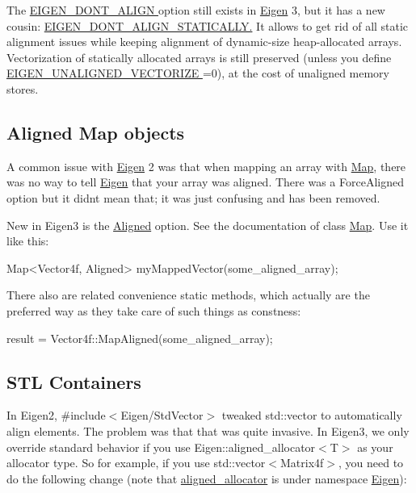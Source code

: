 The \hyperlink{_topic_preprocessor_directives_TopicPreprocessorDirectivesPerformance}{E\+I\+G\+E\+N\+\_\+\+D\+O\+N\+T\+\_\+\+A\+L\+I\+GN } option still exists in \hyperlink{namespace_eigen}{Eigen} 3, but it has a new cousin\+: \hyperlink{_topic_preprocessor_directives_TopicPreprocessorDirectivesPerformance}{E\+I\+G\+E\+N\+\_\+\+D\+O\+N\+T\+\_\+\+A\+L\+I\+G\+N\+\_\+\+S\+T\+A\+T\+I\+C\+A\+L\+LY.} It allows to get rid of all static alignment issues while keeping alignment of dynamic-\/size heap-\/allocated arrays. Vectorization of statically allocated arrays is still preserved (unless you define \hyperlink{_topic_preprocessor_directives_TopicPreprocessorDirectivesPerformance}{E\+I\+G\+E\+N\+\_\+\+U\+N\+A\+L\+I\+G\+N\+E\+D\+\_\+\+V\+E\+C\+T\+O\+R\+I\+ZE } =0), at the cost of unaligned memory stores.\hypertarget{_eigen2_to_eigen3_AlignedMap}{}\subsection{Aligned Map objects}\label{_eigen2_to_eigen3_AlignedMap}
A common issue with \hyperlink{namespace_eigen}{Eigen} 2 was that when mapping an array with \hyperlink{group___core___module_class_eigen_1_1_map}{Map}, there was no way to tell \hyperlink{namespace_eigen}{Eigen} that your array was aligned. There was a Force\+Aligned option but it didn\textquotesingle{}t mean that; it was just confusing and has been removed.

New in Eigen3 is the \hyperlink{group__enums_gga45fe06e29902b7a2773de05ba27b47a1ad37d4c71425bb286e9b4103830538fbf}{Aligned} option. See the documentation of class \hyperlink{group___core___module_class_eigen_1_1_map}{Map}. Use it like this\+: 
\begin{DoxyCode}
Map<Vector4f, Aligned> myMappedVector(some\_aligned\_array);
\end{DoxyCode}
 There also are related convenience static methods, which actually are the preferred way as they take care of such things as constness\+: 
\begin{DoxyCode}
result = Vector4f::MapAligned(some\_aligned\_array);
\end{DoxyCode}
\hypertarget{_eigen2_to_eigen3_StdContainers}{}\subsection{S\+T\+L Containers}\label{_eigen2_to_eigen3_StdContainers}
In Eigen2, {\ttfamily \#include$<$Eigen/\+Std\+Vector$>$} tweaked std\+::vector to automatically align elements. The problem was that that was quite invasive. In Eigen3, we only override standard behavior if you use Eigen\+::aligned\+\_\+allocator$<$\+T$>$ as your allocator type. So for example, if you use std\+::vector$<$\+Matrix4f$>$, you need to do the following change (note that \hyperlink{group___core___module_class_eigen_1_1aligned__allocator}{aligned\+\_\+allocator} is under namespace \hyperlink{namespace_eigen}{Eigen})\+:

